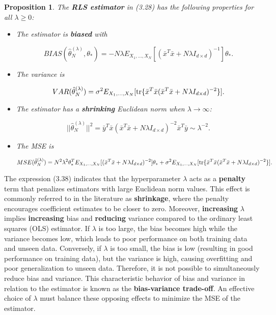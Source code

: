 \documentclass{report}
\newtheorem{proposition}{Proposition}[chapter]
\begin{document}
\begin{proposition}
The \textbf{RLS estimator} in (3.28) has the following properties for all $\lambda \geq 0$:
\begin{itemize}
\item The estimator is \textbf{biased} with

\begin{equation}
BIAS(\hat{\theta}_N^{(\lambda)}, \theta_*) = -N\lambda E_{X_1,\dots,X_N}[(\bar{x}^T\bar{x}+N\lambda I_{d\times d})^{-1}]\theta_*.
\end{equation}

\item The variance is

\begin{equation}
VAR(\hat{\theta}_N^{(\lambda)}) = \sigma^2E_{X_1,\dots,X_N}[\textup{tr}\{\bar{x}^T\bar{x}(\bar{x}^T\bar{x}+N\lambda I_{d\times d})^{-2}\}].
\end{equation}

\item The estimator has a \textbf{shrinking} Euclidean norm when $\lambda \to \infty$:

\begin{equation}
||\hat{\theta}_N^{(\lambda)}||^2 = \bar{y}^T\bar{x}(\bar{x}^T\bar{x} +N\lambda I_{d\times d})^{-2}\bar{x}^T\bar{y} \sim \lambda^{-2}.
\end{equation}

\item The MSE is

\begin{equation}
MSE(\hat{\theta}_N^{(\lambda)}) = N^2\lambda^2\theta_*^TE_{X_1,\dots,X_N}[(\bar{x}^T\bar{x}+N\lambda I_{d\times d})^{-2}]\theta_* +  \sigma^2E_{X_1,\dots,X_N}[\textup{tr}\{\bar{x}^T\bar{x}(\bar{x}^T\bar{x}+N\lambda I_{d\times d})^{-2}\}].
\end{equation}
\end{itemize}
\end{proposition}

The expression (3.38) indicates that the hyperparameter $\lambda$ acts as a \textbf{penalty} term that penalizes estimators with large Euclidean norm values. This effect is commonly referred to in the literature as \textbf{shrinkage}, where the penalty encourages coefficient estimates to be closer to zero. Moreover, \textbf{increasing} $\lambda$ implies \textbf{increasing} bias and \textbf{reducing} variance compared to the ordinary least squares (OLS) estimator. If $\lambda$ is too large, the bias becomes high while the variance becomes low, which leads to poor performance on both training data and unseen data. Conversely, if $\lambda$ is too small, the bias is low (resulting in good performance on training data), but the variance is high, causing overfitting and poor generalization to unseen data. Therefore, it is not possible to simultaneously reduce bias and variance. This characteristic behavior of bias and variance in relation to the estimator is known as the \textbf{bias-variance trade-off}. An effective choice of $\lambda$ must balance these opposing effects to minimize the MSE of the estimator.
\end{document}
